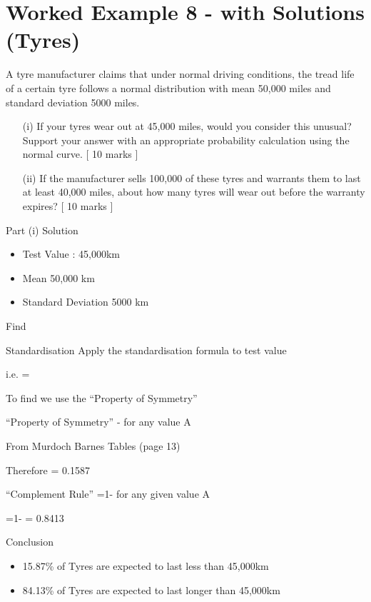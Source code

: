 ﻿\documentclass[]{report}
\begin{document}
\section{Worked Example 8 - with Solutions (Tyres)}
A tyre manufacturer claims that under normal driving conditions, the tread life of a certain tyre follows a normal distribution with mean 50,000 miles and standard deviation 5000 miles.

\begin{itemize}
	\item[(i)] If your tyres wear out at 45,000 miles, would you consider this unusual? Support your answer with an appropriate probability calculation using the normal curve. [ 10 marks ]
	\item[(ii)] If the manufacturer sells 100,000 of these tyres and warrants them to last at least 40,000 miles, about how many tyres will wear out before the warranty expires? [ 10 marks ]
\end{itemize}


Part (i) Solution

\begin{itemize}
	\item Test Value : 45,000km			
	\item Mean 50,000 km	
	\item Standard Deviation 5000	 km
\end{itemize}


Find  

Standardisation
Apply the standardisation formula	 	to test value


i.e.  = 

To find   we use the “Property of Symmetry”

“Property of Symmetry” -   for any value A

From Murdoch Barnes Tables (page 13)  

Therefore   = 0.1587 

“Complement Rule”		 =1-  for any given value A

=1-  = 0.8413

Conclusion
\begin{itemize}
\item 15.87\% of Tyres are expected to last less than 45,000km
\item 84.13\% of Tyres are expected to last longer than 45,000km
\end{itemize}
\end{document}
